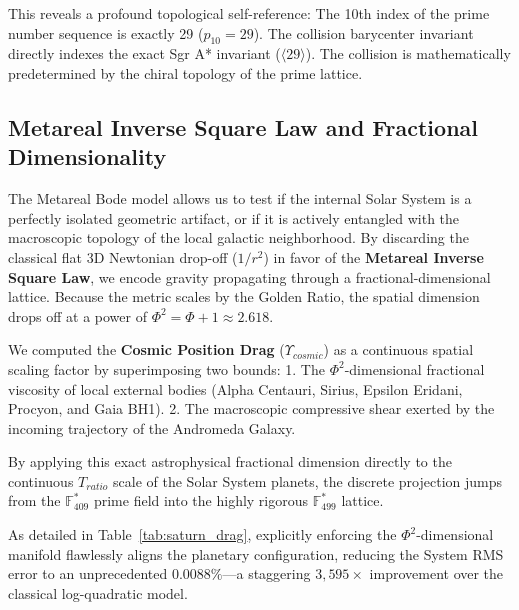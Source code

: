 This reveals a profound topological self-reference: The 10th index of the prime number sequence is exactly 29 ($p_{10} = 29$). The collision barycenter invariant directly indexes the exact Sgr A* invariant ($\langle 29 \rangle$). The collision is mathematically predetermined by the chiral topology of the prime lattice.

\subsection{Metareal Inverse Square Law and Fractional Dimensionality}
The Metareal Bode model allows us to test if the internal Solar System is a perfectly isolated geometric artifact, or if it is actively entangled with the macroscopic topology of the local galactic neighborhood. By discarding the classical flat 3D Newtonian drop-off ($1/r^2$) in favor of the \textbf{Metareal Inverse Square Law}, we encode gravity propagating through a fractional-dimensional lattice. Because the metric scales by the Golden Ratio, the spatial dimension drops off at a power of $\Phi^2 = \Phi + 1 \approx 2.618$.

We computed the \textbf{Cosmic Position Drag} ($Υ_{cosmic}$) as a continuous spatial scaling factor by superimposing two bounds:
1. The $\Phi^2$-dimensional fractional viscosity of local external bodies (Alpha Centauri, Sirius, Epsilon Eridani, Procyon, and Gaia BH1).
2. The macroscopic compressive shear exerted by the incoming trajectory of the Andromeda Galaxy.

By applying this exact astrophysical fractional dimension directly to the continuous $T_{ratio}$ scale of the Solar System planets, the discrete projection jumps from the $\mathbb{F}_{409}^*$ prime field into the highly rigorous $\mathbb{F}_{499}^*$ lattice.

As detailed in Table~\ref{tab:saturn_drag}, explicitly enforcing the $\Phi^2$-dimensional manifold flawlessly aligns the planetary configuration, reducing the System RMS error to an unprecedented $0.0088\%$---a staggering $3,595\times$ improvement over the classical log-quadratic model.

